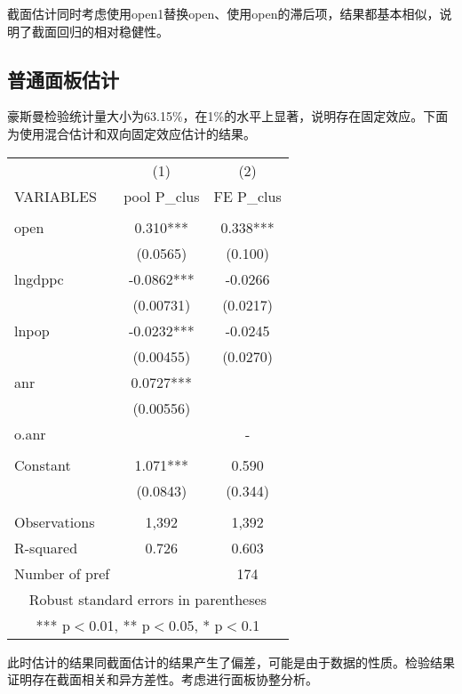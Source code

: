 \documentclass[10pt]{article}
\begin{document}
截面估计同时考虑使用open1替换open、使用open的滞后项，结果都基本相似，说明了截面回归的相对稳健性。

\subsection{普通面板估计}
    豪斯曼检验统计量大小为63.15\%，在1\%的水平上显著，说明存在固定效应。下面为使用混合估计和双向固定效应估计的结果。

    \begin{center}

        \begin{tabular}{lcc} \hline
         & (1) & (2) \\
        VARIABLES & pool P\_clus & FE P\_clus \\ \hline
         &  &  \\
        open & 0.310*** & 0.338*** \\
         & (0.0565) & (0.100) \\
        lngdppc & -0.0862*** & -0.0266 \\
         & (0.00731) & (0.0217) \\
        lnpop & -0.0232*** & -0.0245 \\
         & (0.00455) & (0.0270) \\
        anr & 0.0727*** &  \\
         & (0.00556) &  \\
        o.anr &  & - \\
         &  &  \\
        Constant & 1.071*** & 0.590 \\
         & (0.0843) & (0.344) \\
         &  &  \\
        Observations & 1,392 & 1,392 \\
        R-squared & 0.726 & 0.603 \\
         Number of pref &  & 174 \\ \hline
        \multicolumn{3}{c}{ Robust standard errors in parentheses} \\
        \multicolumn{3}{c}{ *** p$<$0.01, ** p$<$0.05, * p$<$0.1} \\
        \end{tabular}
    \end{center}

    此时估计的结果同截面估计的结果产生了偏差，可能是由于数据的性质。检验结果证明存在截面相关和异方差性。考虑进行面板协整分析。
\end{document}
